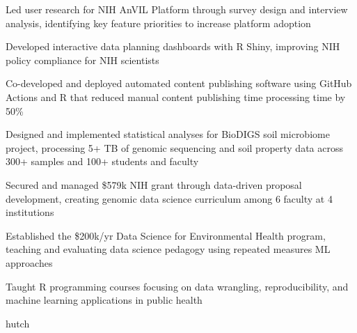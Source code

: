 \documentclass{ats_resume}
\begin{document}
{{%
            
            \item Led user research for NIH AnVIL Platform through survey design and interview analysis, identifying key feature priorities to increase platform adoption
            \item Developed interactive data planning dashboards with R Shiny, improving NIH policy compliance for NIH scientists
            \item Co-developed and deployed automated content publishing software using GitHub Actions and R that reduced manual content publishing time processing time by 50\%
            \item Designed and implemented statistical analyses for BioDIGS soil microbiome project, processing 5+ TB of genomic sequencing and soil property data across 300+ samples and 100+ students and faculty
            \item Secured and managed \$579k NIH grant through data-driven proposal development, creating genomic data science curriculum among 6 faculty at 4 institutions
            \item Established the \$200k/yr Data Science for Environmental Health program, teaching and evaluating data science pedagogy using repeated measures ML approaches
            \item Taught R programming courses focusing on data wrangling, reproducibility, and machine learning applications in public health
       }{hutch} \\
       
}
\end{document}
